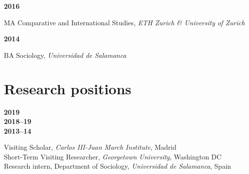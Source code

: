 \documentclass[a4paper, 12pt]{article}
\begin{document}
\vspace{10pt}

\noindent
\begin{minipage}[t]{0.1\textwidth}
  \flushleft
	\textbf{2016}
\end{minipage}
\begin{minipage}[t]{0.9\textwidth}
  MA Comparative and International Studies, \textit{ETH Zurich \& University of Zurich}
\end{minipage}


\noindent
\begin{minipage}[t]{0.1\textwidth}
  \flushleft
	\textbf{2014}
\end{minipage}
\begin{minipage}[t]{0.9\textwidth}
  BA Sociology, \textit{Universidad de Salamanca}
\end{minipage}

\vspace{0pt}
\section*{Research positions}

\begin{minipage}[t]{0.1\textwidth}
  \flushleft
  \textbf{2019}\\\vspace{7pt}
	\textbf{2018--19}\\\vspace{7pt}
	\textbf{2013--14}
\end{minipage}
\begin{minipage}[t]{0.9\textwidth}
  Visiting Scholar, {\it Carlos III-Juan March Institute}, Madrid\vspace{2pt}\\
	Short-Term Visiting Researcher, {\it Georgetown University}, Washington DC\vspace{2pt}\\
	Research intern, Department of Sociology, {\it Universidad de Salamanca}, Spain
\end{minipage}
\end{document}
